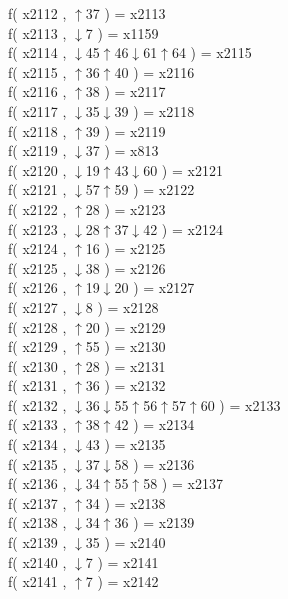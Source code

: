 f( x2112 , $\uparrow$37 ) = x2113 \\
f( x2113 , $\downarrow$7 ) = x1159 \\
f( x2114 , $\downarrow$45$\uparrow$46$\downarrow$61$\uparrow$64 ) = x2115 \\
f( x2115 , $\uparrow$36$\uparrow$40 ) = x2116 \\
f( x2116 , $\uparrow$38 ) = x2117 \\
f( x2117 , $\downarrow$35$\downarrow$39 ) = x2118 \\
f( x2118 , $\uparrow$39 ) = x2119 \\
f( x2119 , $\downarrow$37 ) = x813 \\
f( x2120 , $\downarrow$19$\uparrow$43$\downarrow$60 ) = x2121 \\
f( x2121 , $\downarrow$57$\uparrow$59 ) = x2122 \\
f( x2122 , $\uparrow$28 ) = x2123 \\
f( x2123 , $\downarrow$28$\uparrow$37$\downarrow$42 ) = x2124 \\
f( x2124 , $\uparrow$16 ) = x2125 \\
f( x2125 , $\downarrow$38 ) = x2126 \\
f( x2126 , $\uparrow$19$\downarrow$20 ) = x2127 \\
f( x2127 , $\downarrow$8 ) = x2128 \\
f( x2128 , $\uparrow$20 ) = x2129 \\
f( x2129 , $\uparrow$55 ) = x2130 \\
f( x2130 , $\uparrow$28 ) = x2131 \\
f( x2131 , $\uparrow$36 ) = x2132 \\
f( x2132 , $\downarrow$36$\downarrow$55$\uparrow$56$\uparrow$57$\uparrow$60 ) = x2133 \\
f( x2133 , $\uparrow$38$\uparrow$42 ) = x2134 \\
f( x2134 , $\downarrow$43 ) = x2135 \\
f( x2135 , $\downarrow$37$\downarrow$58 ) = x2136 \\
f( x2136 , $\downarrow$34$\uparrow$55$\uparrow$58 ) = x2137 \\
f( x2137 , $\uparrow$34 ) = x2138 \\
f( x2138 , $\downarrow$34$\uparrow$36 ) = x2139 \\
f( x2139 , $\downarrow$35 ) = x2140 \\
f( x2140 , $\downarrow$7 ) = x2141 \\
f( x2141 , $\uparrow$7 ) = x2142 \\
